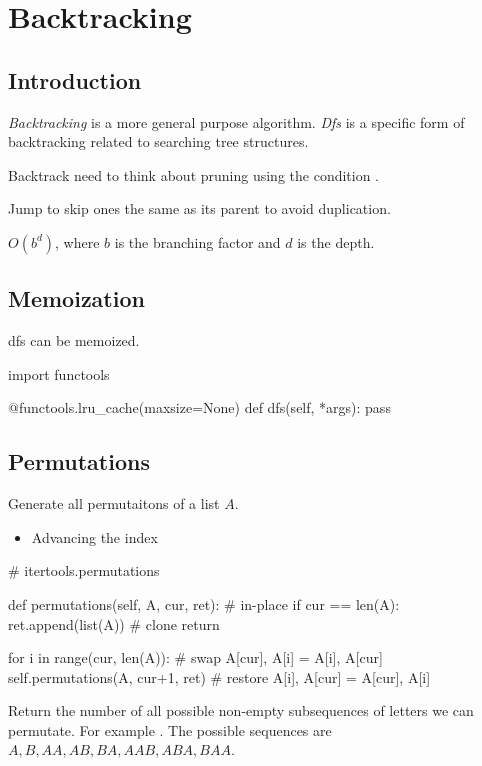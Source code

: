 \chapter{Backtracking}
\section{Introduction}
 \textit{Backtracking} is a more general purpose algorithm. \textit{Dfs} is a specific form of backtracking related to searching tree structures. 

 Backtrack need to think about pruning using the condition .

 Jump to skip ones the same as its parent to avoid duplication.

 $O(b^d)$, where $b$ is the branching factor and $d$ is the depth. 


\section{Memoization}
dfs can be memoized.
\begin{python}
import functools

@functools.lru_cache(maxsize=None)
def dfs(self, *args):
  pass
\end{python}
\section{Permutations}
 Generate all permutaitons of a list $A$.
\begin{itemize}
\item Advancing the index 
\end{itemize}

\begin{python}
# itertools.permutations 

def permutations(self, A, cur, ret):
    # in-place
    if cur == len(A):
        ret.append(list(A))  # clone
        return
    
    for i in range(cur, len(A)):
        # swap
        A[cur], A[i] = A[i], A[cur]
        self.permutations(A, cur+1, ret)
        # restore
        A[i], A[cur] = A[cur], A[i]
\end{python}

 Return the number of all possible non-empty subsequences of letters we can permutate. For example . The possible sequences are $A, B, AA, AB, BA, AAB, ABA, BAA$.

